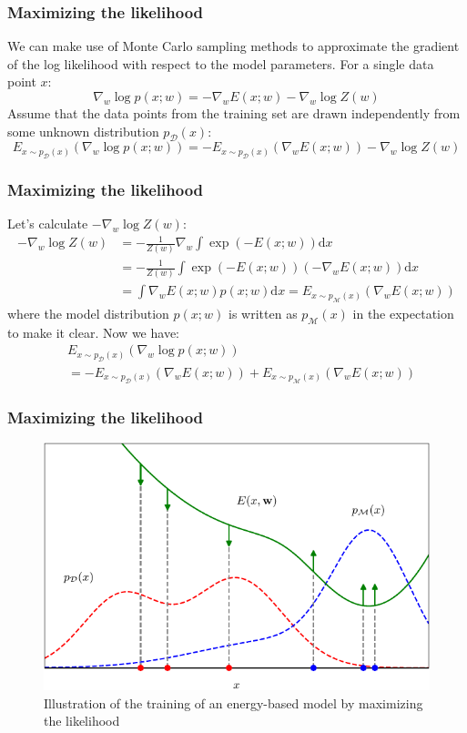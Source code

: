 \documentclass{beamer}
\begin{document}
\begin{frame}
    \frametitle{Maximizing the likelihood}
    We can make use of Monte Carlo sampling methods to approximate the gradient of the log likelihood with respect to the model parameters. For a single data point $x$:
    \begin{equation*}
        \nabla_{w}\log{}p(x;w)=-\nabla_{w}E(x;w)-\nabla_{w}\log{}Z(w)
    \end{equation*}
    Assume that the data points from the training set are drawn independently from some unknown distribution $p_{\mathcal{D}}(x)$:
    \begin{equation*}
        E_{x\sim{}p_{\mathcal{D}}(x)}(\nabla_{w}\log{}p(x;w))=-E_{x\sim{}p_{\mathcal{D}}(x)}(\nabla_{w}E(x;w))-\nabla_{w}\log{}Z(w)
    \end{equation*}
\end{frame}

\begin{frame}
    \frametitle{Maximizing the likelihood}
    Let's calculate $-\nabla_{w}\log{}Z(w)$:
    \begin{align*}
        -\nabla_{w}\log{}Z(w)&=-\frac{1}{Z(w)}\nabla_{w}\int\exp(-E(x;w))\mathrm{d}x \\
        &=-\frac{1}{Z(w)}\int\exp(-E(x;w))(-\nabla_{w}E(x;w))\mathrm{d}x \\
        &=\int\nabla_{w}E(x;w)p(x;w)\mathrm{d}x=E_{x\sim{}p_{\mathcal{M}}(x)}(\nabla_{w}E(x;w))
    \end{align*}
    where the model distribution $p(x;w)$ is written as $p_{\mathcal{M}}(x)$ in the expectation to make it clear. Now we have:
    \begin{align*}
        &E_{x\sim{}p_{\mathcal{D}}(x)}(\nabla_{w}\log{}p(x;w)) \\
        &=-E_{x\sim{}p_{\mathcal{D}}(x)}(\nabla_{w}E(x;w))+E_{x\sim{}p_{\mathcal{M}}(x)}(\nabla_{w}E(x;w))
    \end{align*}
\end{frame}

\begin{frame}
    \frametitle{Maximizing the likelihood}
    \begin{figure}
        \caption{Illustration of the training of an energy-based model by maximizing the likelihood}
        \includegraphics[height=0.6\textheight]{Figure_13.pdf}
    \end{figure}
\end{frame}
\end{document}

